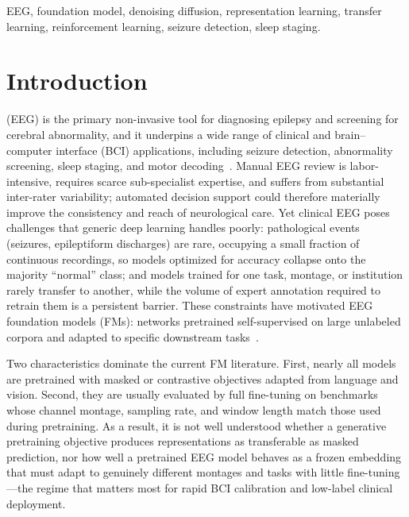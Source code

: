 \documentclass[journal]{IEEEtran}
\begin{document}
\begin{IEEEkeywords}
EEG, foundation model, denoising diffusion, representation learning, transfer
learning, reinforcement learning, seizure detection, sleep staging.
\end{IEEEkeywords}

\section{Introduction}
 (EEG) is the primary non-invasive tool
for diagnosing epilepsy and screening for cerebral abnormality, and it underpins
a wide range of clinical and brain--computer interface (BCI) applications,
including seizure detection, abnormality screening, sleep staging, and motor
decoding~\cite{obeid2016tuh,roy2019dl}. Manual EEG review is labor-intensive,
requires scarce sub-specialist expertise, and suffers from substantial
inter-rater variability; automated decision support could therefore materially
improve the consistency and reach of neurological care. Yet clinical EEG poses
challenges that generic deep learning handles poorly: pathological events
(seizures, epileptiform discharges) are rare, occupying a small fraction
of continuous recordings, so models optimized for accuracy collapse onto the
majority ``normal'' class; and models trained for one task, montage, or
institution rarely transfer to another, while the volume of expert annotation
required to retrain them is a persistent barrier. These constraints have
motivated EEG foundation models (FMs): networks pretrained self-supervised
on large unlabeled corpora and adapted to specific downstream
tasks~\cite{yang2024biot,jiang2024labram,wang2024cbramod,wang2024eegpt}.

Two characteristics dominate the current FM literature. First, nearly all models
are pretrained with masked or contrastive objectives adapted from
language and vision. Second, they are usually evaluated by full
fine-tuning on benchmarks whose channel montage, sampling rate, and window
length match those used during pretraining. As a result, it is not well
understood whether a generative pretraining objective produces
representations as transferable as masked prediction, nor how well a pretrained
EEG model behaves as a frozen embedding that must adapt to genuinely
different montages and tasks with little fine-tuning---the regime that matters
most for rapid BCI calibration and low-label clinical deployment.
\end{document}

